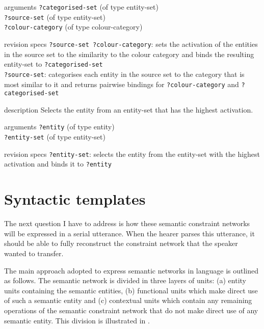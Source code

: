\begin{explanation}{arguments}
\verb+?categorised-set+ (of type entity-set) \\
\verb+?source-set+ (of type entity-set) \\
\verb+?colour-category+ (of type colour-category)
\end{explanation}

\begin{explanation}{revision specs}
  \verb+?source-set ?colour-category+: sets the activation of the
  entities in the source set to the similarity to the colour category
  and binds the resulting entity-set to \verb+?categorised-set+ \\
  \verb+?source-set+: categorises each entity in the source set to the
  category that is most similar to it and returns pairwise bindings
  for \verb+?colour-category+ and \verb+?categorised-set+
\end{explanation}


\begin{explanation}{description}
Selects the entity from an entity-set that has the highest activation.
\end{explanation}

\begin{explanation}{arguments}
\verb+?entity+ (of type entity) \\
\verb+?entity-set+ (of type entity-set)
\end{explanation}

\begin{explanation}{revision specs}
\verb+?entity-set+: selects the entity from the entity-set with the highest activation and binds it to \verb+?entity+
\end{explanation}

\section{Syntactic templates}
\label{s:bcs-syntactic-templates}

The next question I have to address is how these semantic constraint
networks will be expressed in a serial utterance. When the hearer
parses this utterance, it should be able to fully reconstruct the
constraint network that the speaker wanted to transfer. 

The main approach adopted to express semantic networks in language is
outlined as follows. The semantic network is divided in three layers
of units: (a) entity units containing the semantic entities, (b)
functional units which make direct use of such a semantic entity and
(c) contextual units which contain any remaining operations of the
semantic constraint network that do not make direct use of any
semantic entity. This division is illustrated in .

